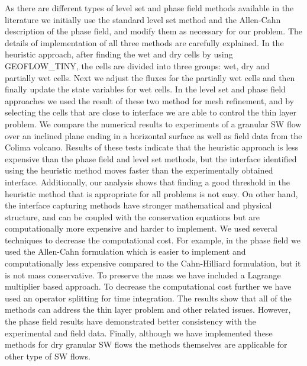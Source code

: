 \documentclass[review]{elsarticle}
\begin{document}
As there are different types of level set and phase field methods available in the 
literature we initially use the standard level set method and the Allen-Cahn description of the phase field, and modify them as necessary for our problem. 
The details of implementation of all three methods are carefully explained.
In the heuristic approach, after finding the wet and dry cells by using GEOFLOW\_TINY, the cells are divided 
into three groups: wet, dry and partially wet cells. Next we adjust the fluxes for the partially wet cells and then finally update the state variables for wet cells.
In the level set and phase field approaches we used the result of these two method for mesh refinement, and by selecting the cells that are close to interface we are able to control the thin layer problem. 
We compare the numerical results to experiments of a granular SW flow over an inclined plane ending in a horizontal surface as well as 
 field data from the Colima volcano.
Results of these tests indicate that
the heuristic approach is less expensive than the phase field and level set methods, but the interface identified using the heuristic method moves faster than the 
experimentally obtained interface. Additionally, our analysis shows that finding a good threshold in the heuristic method that is appropriate for all problems is not easy. 
On other hand, the interface capturing methods have stronger mathematical and physical structure, and can be coupled with the conservation equations but are computationally more expensive and harder 
to implement. We used several techniques to decrease the computational cost. For example, in the phase field we used the Allen-Cahn formulation which is easier to implement and computationally less 
expensive compared to the Cahn-Hilliard formulation, but it is not mass conservative. To preserve the mass we have included a Lagrange multiplier \cite{Kim2014,Yang2006} based approach. To decrease the computational cost further
 we have used an operator splitting for time integration. 
 The   results show that all of the methods can address the thin layer problem and other 
related issues. However, the phase field results have demonstrated better consistency with the experimental and field data. 
Finally, although we have implemented these methods for dry granular  SW flows the methods themselves are applicable for other type of SW flows.  
\end{document}
